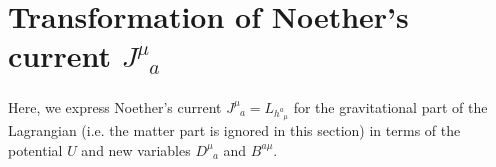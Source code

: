\documentclass[
10pt, %
a4paper, %
oneside, %
twocolumn,
headinclude,footinclude, %
BCOR5mm, %
]{scrartcl}
\newcommand{\tetrsymbol}{h}
\newcommand{\tetr}[2]{\tetrsymbol^{#1}_{\phantom{#1}#2}}
\newcommand{\Dm}[2]{D_{\phantom{#2}#1}^{#2}}	%
\newcommand{\Bm}[2]{B^{#1#2}}	%
\newcommand{\Laghodge}{L}%
\newcommand{\Um}{U}%
\newcommand{\LCsymb}{\bm{\in}}    %
\newcommand{\HDT}[1]{\accentset{\star}{T}^{#1}}
\newcommand{\KD}[2]{\delta^{#1}_{\ #2}}
\newcommand{\NC}[2]{J^{#2}_{\phantom{#2}#1}}
\begin{document}
	
	
	
	\section{Transformation of Noether's current $ \NC{a}{\mu} $}\label{app.sec.NC}
	
	Here, we express Noether's current $ \NC{a}{\mu} = \Laghodge_{\tetr{a}{\mu}} $ for the 
	gravitational part of the Lagrangian (i.e. the matter part is ignored in this section) in terms 
	of 
	the 
	potential $ \Um $ and new variables $ \Dm{a}{\mu} $ and $ \Bm{a}{\mu} $. 
	
\end{document}
